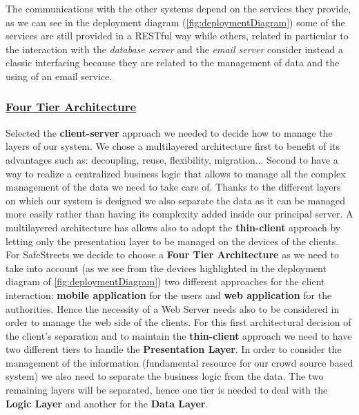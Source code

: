 			 The communications with the other systems depend on the services they provide, as we can see in the deployment diagram (\autoref{fig:deploymentDiagram}) some of the services are still provided in a RESTful way while others, related in particular to the interaction with the \emph{database server} and the \emph{email server} consider instead a classic interfacing because they are related to the management of data and the using of an email service.
			
		\subsubsection[Four Tier Architecture]{\hyperlink{toc}{Four Tier Architecture}}
			\label{sec:fourTierArchitectureDecision}
			
			Selected the \textbf{client-server} approach we needed to decide how to manage the layers of our system. We chose a multilayered architecture first to benefit of its advantages such as: decoupling, reuse, flexibility, migration... Second to have a way to realize a centralized business logic that allows to manage all the complex management of the data we need to take care of. Thanks to the different layers on which our system is designed we also separate the data as it can be managed more easily rather than having its complexity added inside our principal server. A multilayered architecture has allows also to adopt the \textbf{thin-client} approach by letting only the presentation layer to be managed on the devices of the clients.\\
			
			For SafeStreets we decide to choose a \textbf{Four Tier Architecture} as we need to take into account (as we see from the devices highlighted in the deployment diagram of \autoref{fig:deploymentDiagram}) two different approaches for the client interaction: \textbf{mobile application} for the users and \textbf{web application} for the authorities. Hence the necessity of a Web Server needs also to be considered in order to manage the web side of the clients. For this first architectural decision of the client's separation and to maintain the \textbf{thin-client} approach we need to have two different tiers to handle the \textbf{Presentation Layer}. In order to consider the management of the information (fundamental resource for our crowd source based system) we also need to separate the business logic from the data. The two remaining layers will be separated, hence one tier is needed to deal with the \textbf{Logic Layer} and another for the \textbf{Data Layer}.\\
			

